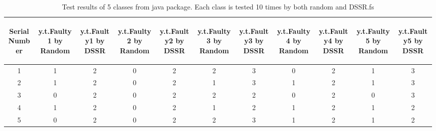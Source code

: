 \documentclass[10pt, conference, compsocconf]{IEEEtran}
\begin{document}
\begin{table}[ht]
\caption{Test results of 5 classes from java package. Each class is tested 10 times by both random and DSSR.fs} %
\centering %
\begin{tabular}{| c | c | c | c | c | c | c | c | c | c | c |} %
\hline\hline %
 \begin{sideways} Serial Number \end{sideways} &  \begin{sideways} y.t.Faulty1 by Random \end{sideways} &  \begin{sideways} y.t.Faulty1 by DSSR \end{sideways} &  \begin{sideways} y.t.Faulty2 by Random \end{sideways} &  \begin{sideways} y.t.Faulty2 by DSSR \end{sideways} & \begin{sideways} y.t.Faulty3 by Random \end{sideways} &  \begin{sideways}y.t.Faulty3 by DSSR \end{sideways} &  \begin{sideways}y.t.Faulty4 by Random \end{sideways} &  \begin{sideways} y.t.Faulty4 by DSSR \end{sideways} &  \begin{sideways} y.t.Faulty5 by Random \end{sideways} &  \begin{sideways} y.t.Faulty5 by DSSR \end{sideways} \\ [1ex] %
\hline  %
1 & 1 & 2 & 0 & 2 & 2 & 3 & 0 & 2 & 1 & 3 \\  %

2 & 1 & 2 & 0 & 2 & 1 & 3 & 1 & 2 & 1 & 3 \\

3 & 0 & 2 & 0 & 2 & 2 & 2 & 0 & 2 & 0 & 3 \\

4 & 1 & 2 & 0 & 2 & 1 & 2 & 1 & 2 & 1 & 2 \\

5 & 0 & 2 & 0 & 2 & 2 & 3 & 1 & 2 & 1 & 2 \\


\end{tabular}
\end{table}
\end{document}
